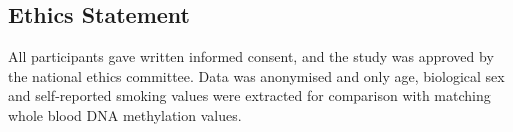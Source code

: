 \documentclass{article} %
\begin{document}
\subsection{Ethics Statement}
All participants gave written informed consent, and the study was approved by the national ethics committee. Data was anonymised and only age, biological sex and self-reported smoking values were extracted for comparison with matching whole blood DNA methylation values.

\printbibliography
\end{document}
